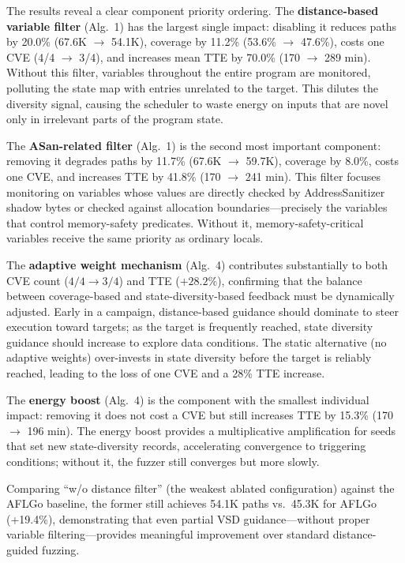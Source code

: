 \documentclass[preprint,12pt,3p]{elsarticle}
\begin{document}
The results reveal a clear component priority ordering.  The
\textbf{distance-based variable filter} (Alg.~1) has the largest single
impact: disabling it reduces paths by 20.0\% (67.6K $\to$ 54.1K),
coverage by 11.2\% (53.6\% $\to$ 47.6\%), costs one CVE (4/4 $\to$ 3/4),
and increases mean TTE by 70.0\% (170 $\to$ 289 min).  Without this filter,
variables throughout the entire program are monitored, polluting the state
map with entries unrelated to the target.  This dilutes the diversity signal,
causing the scheduler to waste energy on inputs that are novel only in
irrelevant parts of the program state.

The \textbf{ASan-related filter} (Alg.~1) is the second most important
component: removing it degrades paths by 11.7\% (67.6K $\to$ 59.7K),
coverage by 8.0\%, costs one CVE, and increases TTE by 41.8\% (170 $\to$
241 min).  This filter focuses monitoring on variables whose values are
directly checked by AddressSanitizer shadow bytes or checked against
allocation boundaries---precisely the variables that control memory-safety
predicates.  Without it, memory-safety-critical variables receive the same
priority as ordinary locals.

The \textbf{adaptive weight mechanism} (Alg.~4) contributes substantially
to both CVE count ($4/4 \to 3/4$) and TTE ($+28.2\%$), confirming that
the balance between coverage-based and state-diversity-based feedback must
be dynamically adjusted.  Early in a campaign, distance-based guidance
should dominate to steer execution toward targets; as the target is
frequently reached, state diversity guidance should increase to explore data
conditions.  The static alternative (no adaptive weights) over-invests in
state diversity before the target is reliably reached, leading to the loss
of one CVE and a 28\% TTE increase.

The \textbf{energy boost} (Alg.~4) is the component with the smallest
individual impact: removing it does not cost a CVE but still increases TTE
by 15.3\% (170 $\to$ 196 min).  The energy boost provides a multiplicative
amplification for seeds that set new state-diversity records, accelerating
convergence to triggering conditions; without it, the fuzzer still converges
but more slowly.

Comparing ``w/o distance filter'' (the weakest ablated configuration) against
the AFLGo baseline, the former still achieves 54.1K paths vs.\ 45.3K for
AFLGo (+19.4\%), demonstrating that even partial VSD guidance---without
proper variable filtering---provides meaningful improvement over standard
distance-guided fuzzing.
\end{document}
